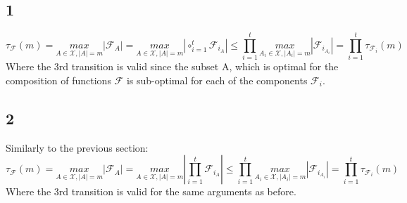 \subsection*{1}
\begin{equation*}
    \tau_\mathcal{F}(m) = \underset{A\in \mathcal{X},|A|=m}{max}|\mathcal{F}_A| 
    = \underset{A\in \mathcal{X},|A|=m}{max}|\circ_{i=1}^t\mathcal{F}_{i_A}| 
    \leq \prod_{i=1}^t \underset{A_i\in \mathcal{X},|A_i|=m}{max}|\mathcal{F}_{i_{A_i}}|
    = \prod_{i=1}^t \tau_{\mathcal{F}_i}(m)
\end{equation*}
Where the 3rd transition is valid since the subset A, which is optimal for the composition of functions $\mathcal{F}$ is sub-optimal for each of the components $\mathcal{F}_i$.

\subsection*{2}
Similarly to the previous section:
\begin{equation*}
    \tau_\mathcal{F}(m) = \underset{A\in \mathcal{X},|A|=m}{max}|\mathcal{F}_A| 
    = \underset{A\in \mathcal{X},|A|=m}{max}|\prod_{i=1}^t\mathcal{F}_{i_A}| 
    \leq \prod_{i=1}^t \underset{A_i\in \mathcal{X},|A_i|=m}{max}|\mathcal{F}_{i_{A_i}}|
    = \prod_{i=1}^t \tau_{\mathcal{F}_i}(m)
\end{equation*}
Where the 3rd transition is valid for the same arguments as before.